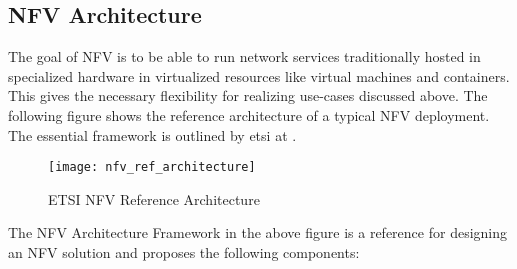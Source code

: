 \subsection{NFV Architecture}

The goal of NFV  is to be able to run network services traditionally hosted in specialized hardware in virtualized resources like virtual machines and containers. This gives the necessary flexibility for realizing use-cases discussed above.  The following figure shows the reference architecture of a typical NFV deployment. The essential framework is outlined by etsi at \cite{etsi02}.

\begin{figure}[h!]
	\centering
	\texttt{[image: nfv\_ref\_architecture]}
	\label{fig:figure5}
    \caption{ETSI NFV Reference Architecture \cite{etsi02}}
\end{figure}

The NFV Architecture Framework in the above figure is a reference for designing an NFV solution and proposes the following components:

